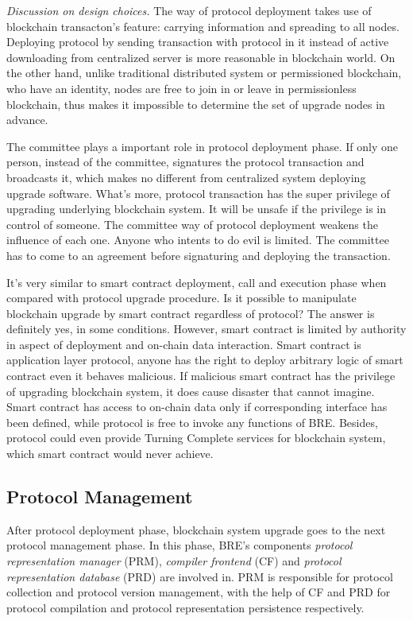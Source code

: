 \documentclass[sigplan,screen]{acmart}
\begin{document}
\textit{Discussion on design choices.} The way of protocol deployment takes use
of blockchain transacton's feature: carrying information and spreading to all
nodes. Deploying protocol by sending transaction with protocol in it instead of
active downloading from centralized server is more reasonable in blockchain
world. On the other hand, unlike traditional distributed system or permissioned
blockchain, who have an identity, nodes are free to join in or leave in
permissionless blockchain, thus makes it impossible to determine the set of
upgrade nodes in advance.

The committee plays a important role in protocol deployment phase. If only one
person, instead of the committee, signatures the protocol transaction
and broadcasts it, which makes no different from centralized system deploying
upgrade software. What's more, protocol transaction has the super
privilege of upgrading underlying blockchain system. It will be unsafe if the
privilege is in control of someone. The committee way of protocol deployment
weakens the influence of each one. Anyone who intents to do evil is limited.
The committee has to come to an agreement before signaturing and deploying the
transaction.

It's very similar to smart contract
deployment, call and execution phase when compared with protocol upgrade
procedure. Is it possible to manipulate blockchain upgrade by smart contract
regardless of protocol? The answer is definitely yes, in some conditions.
However, smart contract is limited by authority in aspect of deployment and
on-chain data interaction. Smart contract is application layer protocol,
anyone has the right to deploy arbitrary logic of smart contract even
it behaves malicious. If malicious smart contract has the privilege of
upgrading blockchain system, it does cause disaster that cannot imagine.
Smart contract has access to on-chain data only if corresponding
interface has been defined,
while protocol is free to invoke any functions of BRE. Besides,
protocol could even provide Turning Complete services for blockchain system,
which smart contract would never achieve.


\subsection{Protocol Management}
After protocol deployment phase, blockchain system upgrade goes to the next
protocol management phase. In this phase, BRE's components \textit{protocol
  representation manager} (PRM), \textit{compiler frontend} (CF) and
\textit{protocol representation database} (PRD) are involved in. PRM is responsible
for protocol collection and protocol version management, with the help of CF
and PRD for protocol compilation and protocol representation persistence
respectively.
\end{document}
